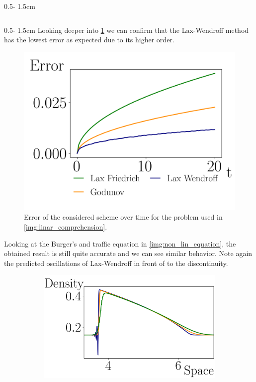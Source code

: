 \documentclass{uibposter}
\begin{document}
\begin{frame}[fragile]
\begin{columns}
\begin{column}{0.5\textwidth - 1.5cm}
\begin{column}{0.5\textwidth - 1.5cm}
Looking deeper into \cref{img:error_over_time} we can confirm that the Lax-Wendroff method has the lowest error as expected due to its higher order.
   
    \begin{figure}
    	\includegraphics{fig/error_over_time.png}
    	\caption{Error of the considered scheme over time for the problem used in \cref{img:linar_comprehension}.}
    	\label{img:error_over_time}
    \end{figure}

Looking at the Burger's and traffic equation in \cref{img:non_lin_equation}, the obtained result is still quite accurate and we can see similar behavior. Note again the predicted oscillations of Lax-Wendroff in front of to the discontinuity.

\begin{figure}
	\begin{subfigure}{\textwidth}
	\includegraphics{fig/traffic_compare_.png}
	\end{subfigure}


\end{figure}
\end{column}
\end{column}
\end{columns}
\end{frame}
\end{document}
